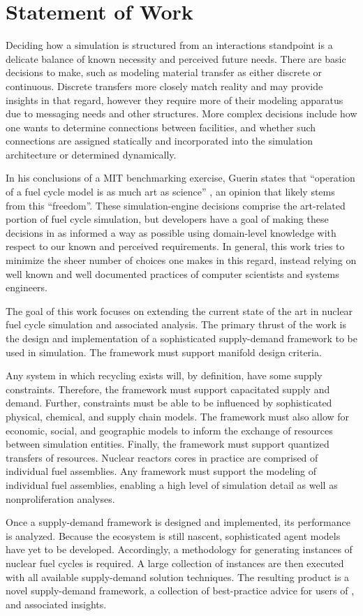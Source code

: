 
\section{Statement of Work}

Deciding how a simulation is structured from an interactions standpoint is a
delicate balance of known necessity and perceived future needs. There are basic
decisions to make, such as modeling material transfer as either discrete or
continuous. Discrete transfers more closely match reality and may provide
insights in that regard, however they require more of their modeling apparatus
due to messaging needs and other structures. More complex decisions include how
one wants to determine connections between facilities, and whether such
connections are assigned statically and incorporated into the simulation
architecture or determined dynamically.

In his conclusions of a MIT benchmarking exercise, Guerin states that
``operation of a fuel cycle model is as much art as science''
\cite{guerin_benchmark_2009}, an opinion that likely stems from this
``freedom''. These simulation-engine decisions comprise the art-related portion
of fuel cycle simulation, but developers have a goal of making these decisions
in as informed a way as possible using domain-level knowledge with respect to
our known and perceived requirements. In general, this work tries to minimize
the sheer number of choices one makes in this regard, instead relying on well
known and well documented practices of computer scientists and systems
engineers.

The goal of this work focuses on extending the current state of the art in
nuclear fuel cycle simulation and associated analysis. The primary thrust of the
work is the design and implementation of a sophisticated supply-demand framework
to be used in simulation. The framework must support manifold design
criteria. 

Any system in which recycling exists will, by definition, have some supply
constraints. Therefore, the framework must support capacitated supply and
demand. Further, constraints must be able to be influenced by sophisticated
physical, chemical, and supply chain models. The framework must also allow for
economic, social, and geographic models to inform the exchange of resources
between simulation entities. Finally, the framework must support quantized
transfers of resources. Nuclear reactors cores in practice are comprised of
individual fuel assemblies. Any framework must support the modeling of
individual fuel assemblies, enabling a high level of simulation detail as well
as nonproliferation analyses.

Once a supply-demand framework is designed and implemented, its performance is
analyzed. Because the \Cyclus ecosystem is still nascent, sophisticated agent
models have yet to be developed. Accordingly, a methodology for generating
instances of nuclear fuel cycles is required. A large collection of instances
are then executed with all available supply-demand solution techniques. The
resulting product is a novel supply-demand framework, a collection of
best-practice advice for users of \Cyclus, and associated insights.

